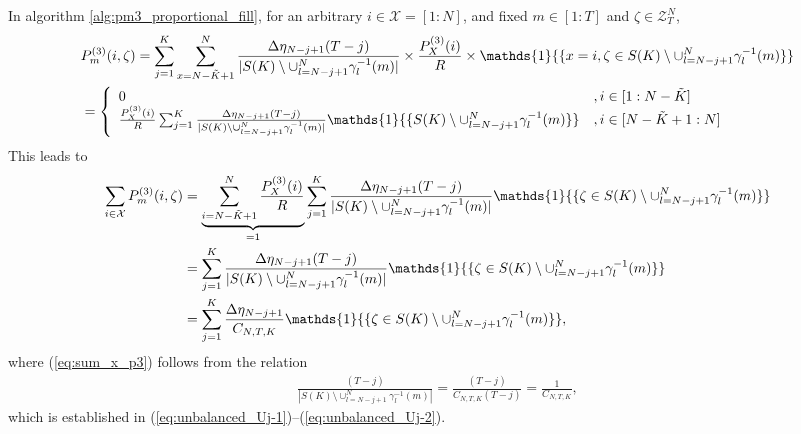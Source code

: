 \documentclass[11pt,letterpaper]{article}
\newcommand{\cX}{\mathcal{X}}
\newcommand{\cZ}{\mathcal{Z}}
\begin{document}
In algorithm \ref{alg:pm3_proportional_fill}, for an arbitrary $i \in \cX = [1:N]$, and fixed $m \in [1:T]$ and $\zeta \in \cZ^N_T$,
\begin{align}
    & P^{(3)}_m(i, \zeta) =\sum_{j=1}^K \sum_{x=N-\tilde{K}+1}^N \frac{\Delta\eta_{N-j+1}(T-j)}{|S(K) \setminus \cup_{l= N-j+1}^N \gamma^{-1}_l(m)|} \times \frac{P_X^{(3)}(i)}{R}\times \mathds{1} {\{ x = i, \zeta \in S(K) \setminus \cup_{l= N-j+1}^N \gamma^{-1}_l(m)\}} \notag \\
    & = \left\{ \begin{array}{ll}
         0 &, i \in [1:N-\tilde{K}]  \\
         \frac{P_X^{(3)}(i)}{R} \sum_{j=1}^K \frac{\Delta\eta_{N-j+1}(T-j)}{|S(K) \setminus \cup_{l= N-j+1}^N \gamma^{-1}_l(m)|}\mathds{1}{\{S(K) \setminus \cup_{l= N-j+1}^N \gamma^{-1}_l(m)\}} & , i\in [N-\tilde{K}+1:N]
    \end{array}\right.
\end{align}
This leads to 
\begin{align}
    \sum_{i \in \cX} P^{(3)}_m(i, \zeta) & = \underbrace{\sum_{i=N-\tilde{K}+1}^N \frac{P_X^{(3)}(i)}{R}}_{=1} \sum_{j=1}^K \frac{\Delta\eta_{N-j+1}(T-j)}{|S(K) \setminus \cup_{l= N-j+1}^N \gamma^{-1}_l(m)|}\mathds{1}{\{ \zeta \in S(K) \setminus \cup_{l= N-j+1}^N \gamma^{-1}_l(m)\}} \notag \\
    & = \sum_{j=1}^K \frac{\Delta\eta_{N-j+1}(T-j)}{|S(K) \setminus \cup_{l= N-j+1}^N \gamma^{-1}_l(m)|}\mathds{1}{\{ \zeta \in S(K) \setminus \cup_{l= N-j+1}^N \gamma^{-1}_l(m)\}} \\
    &  = \sum_{j=1}^K \frac{\Delta\eta_{N-j+1}}{C_{N,T,K}}\mathds{1}{\{ \zeta \in S(K) \setminus \cup_{l= N-j+1}^N \gamma^{-1}_l(m)\}}, \label{eq:sum_x_p3}
\end{align}
where (\ref{eq:sum_x_p3}) follows from the relation
\begin{align}
    \frac{(T-j)}{|S(K) \setminus \cup_{l= N-j+1}^N \gamma^{-1}_l(m)|} = \frac{(T-j)}{C_{N,T,K}(T-j)} = \frac{1}{C_{N,T,K}},
\end{align}
which is established in (\ref{eq:unbalanced_Uj-1})–(\ref{eq:unbalanced_Uj-2}).
\end{document}
